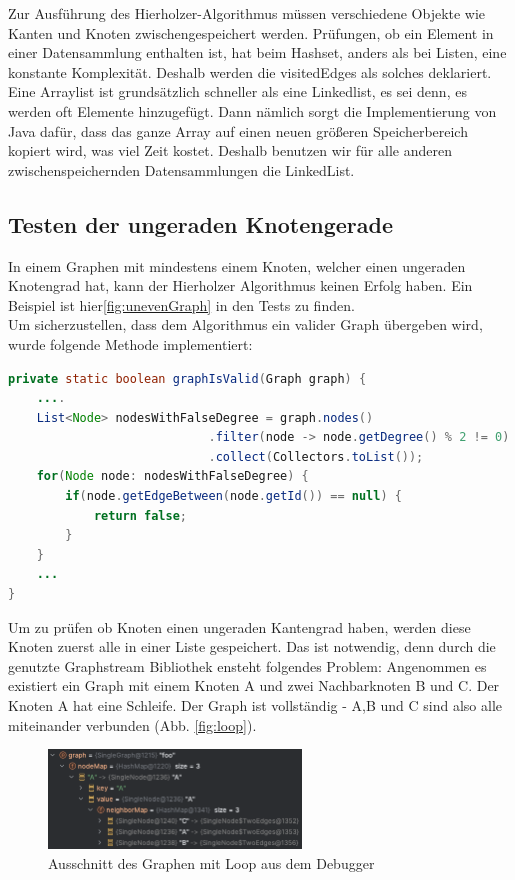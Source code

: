 Zur Ausführung des Hierholzer-Algorithmus müssen verschiedene Objekte wie Kanten und Knoten zwischengespeichert werden. Prüfungen, ob ein Element in einer Datensammlung enthalten ist, hat beim Hashset, anders als bei Listen, eine konstante Komplexität. Deshalb werden die visitedEdges als solches deklariert. 
Eine Arraylist ist grundsätzlich schneller als eine Linkedlist, es sei denn, es werden oft Elemente hinzugefügt. Dann nämlich sorgt die Implementierung von Java dafür, dass das ganze Array auf einen neuen größeren Speicherbereich kopiert wird, was viel Zeit kostet.
Deshalb benutzen wir für alle anderen zwischenspeichernden Datensammlungen die LinkedList.

\subsection{Testen der ungeraden Knotengerade}

In einem Graphen mit mindestens einem Knoten, welcher einen ungeraden Knotengrad hat, kann der Hierholzer Algorithmus keinen Erfolg haben. Ein Beispiel ist hier\ref{fig:unevenGraph} in den Tests zu finden.\\

Um sicherzustellen, dass dem Algorithmus ein valider Graph übergeben wird, wurde folgende Methode implementiert:

\begin{lstlisting}[language = java, frame = trBL]
private static boolean graphIsValid(Graph graph) {
    ....
    List<Node> nodesWithFalseDegree = graph.nodes()
                            .filter(node -> node.getDegree() % 2 != 0)
                            .collect(Collectors.toList());        
    for(Node node: nodesWithFalseDegree) {
        if(node.getEdgeBetween(node.getId()) == null) {
            return false;
        }
    }
    ...
}
\end{lstlisting}

Um zu prüfen ob Knoten einen ungeraden Kantengrad haben, werden diese Knoten zuerst alle in einer Liste gespeichert. Das ist notwendig, denn durch die genutzte Graphstream Bibliothek ensteht folgendes Problem: Angenommen es existiert ein Graph mit einem Knoten A und zwei Nachbarknoten B und C. Der Knoten A hat eine Schleife. Der Graph ist vollständig - A,B und C sind also alle miteinander verbunden (Abb. \ref{fig:loop}). 

\begin{figure}[htbp]
	\centering
		\includegraphics[width=0.6\textwidth]{Latex/Figs/loopedGraphDebugger.png}		
	\caption{Ausschnitt des Graphen mit Loop aus dem Debugger}
	\label{fig:loopedGraphDebugger}
\end{figure}

